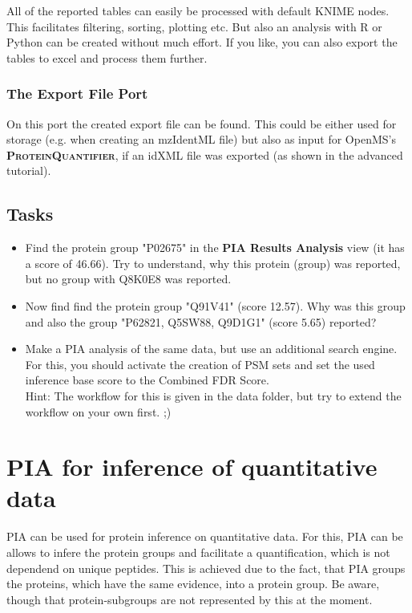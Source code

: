 \documentclass[a4paper,11pt,twoside]{article}
\newcommand{\knimenode}[1]{{\scshape\bfseries #1}}
\begin{document}
All of the reported tables can easily be processed with default KNIME nodes.
This facilitates filtering, sorting, plotting etc. But also an analysis with R
or Python can be created without much effort. If you like, you can also export
the tables to excel and process them further.


\subsubsection{The Export File Port}

On this port the created export file can be found. This could be either used
for storage (e.g. when creating an mzIdentML file) but also as input for
OpenMS's \knimenode{ProteinQuantifier}, if an idXML file was exported (as shown
in the advanced tutorial).


\subsection{Tasks}

\begin{itemize}
	\item Find the protein group "P02675" in the \textbf{PIA Results Analysis}
	view (it has a score of 46.66). Try to understand, why this protein (group)
	was reported, but no group with Q8K0E8 was reported.

	\item Now find find the protein group "Q91V41" (score 12.57). Why
	was this group and also the group "P62821, Q5SW88, Q9D1G1" (score 5.65)
	reported?

	\item Make a PIA analysis of the same data, but use an additional search
	engine. For this, you should activate the creation of PSM sets and set the
	used inference base score to the Combined FDR Score.\\
	Hint: The workflow for this is given in the data folder, but try to extend the
	workflow on your own first. ;)
\end{itemize}



\newpage
\section{PIA for inference of quantitative data}

PIA can be used for protein inference on quantitative data. For this, PIA can be
allows to infere the protein groups and facilitate a quantification, which is
not dependend on unique peptides. This is achieved due to the fact, that PIA
groups the proteins, which have the same evidence, into a protein group. Be
aware, though that protein-subgroups are not represented by this at the moment.
\end{document}
